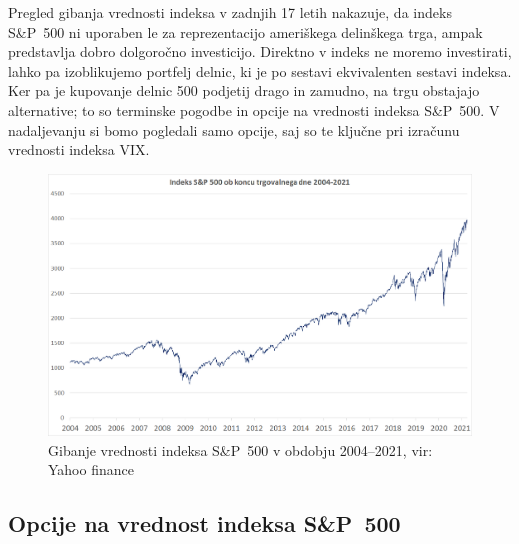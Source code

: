 \documentclass[12pt,a4paper, reqno]{amsart}
\theoremstyle{definition} %
\theoremstyle{plain} %
\begin{document}
Pregled gibanja vrednosti indeksa v zadnjih 17 letih nakazuje, da indeks S\&P~500 ni uporaben le za reprezentacijo ameriškega delinškega trga, ampak predstavlja dobro dolgoročno investicijo. Direktno v indeks ne moremo investirati, lahko pa izoblikujemo portfelj delnic, ki je po sestavi ekvivalenten sestavi indeksa. Ker pa je kupovanje delnic 500 podjetij drago in zamudno, na trgu obstajajo alternative; to so terminske pogodbe in opcije na vrednosti indeksa S\&P~500. V nadaljevanju si bomo pogledali samo opcije, saj so te ključne pri izračunu vrednosti indeksa VIX.
\begin{figure}[!h]
\centering
\includegraphics[width = 15 cm]{Grafi/SPX_2004-2021.png}
\caption{Gibanje vrednosti indeksa S\&P~500 v obdobju 2004--2021, vir: Yahoo finance}
\label{Graf 1}
\end{figure}


\subsection{Opcije na vrednost indeksa S\&P~500}
\end{document}
